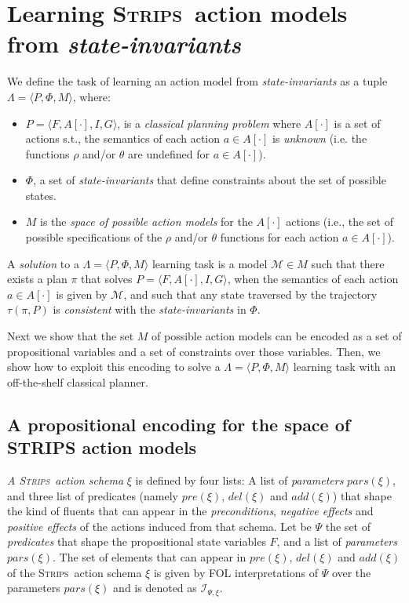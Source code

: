 \documentclass{article}
\newcommand{\tup}[1]{{\langle #1 \rangle}}
\newcommand{\strips}{\textsc{Strips}}
\begin{document}
\section{Learning \strips\ action models from {\em state-invariants}}
\label{sec:learning}
We define the task of learning an action model from {\em state-invariants} as a tuple $\Lambda=\tup{P,\Phi,M}$, where:
\begin{itemize}
\item $P=\tup{F,A[\cdot],I,G}$, is a {\em classical planning problem} where $A[\cdot]$ is a set of actions s.t., the semantics of each action $a\in A[\cdot]$ is {\em unknown} (i.e. the functions $\rho$ and/or $\theta$ are undefined for $a\in A[\cdot]$).
\item $\Phi$, a set of {\em state-invariants} that define constraints about the set of possible states.
\item $M$ is the {\em space of possible action models} for the $A[\cdot]$ actions (i.e., the set of possible specifications of the $\rho$ and/or $\theta$ functions for each action $a\in A[\cdot]$).
\end{itemize}

A {\em solution} to a $\Lambda=\tup{P,\Phi,M}$ learning task is a model $\mathcal{M}\in M$ such that there exists a plan $\pi$ that solves $P=\tup{F,A[\cdot],I,G}$, when the semantics of each action $a\in A[\cdot]$ is given by $\mathcal{M}$, and such that any state traversed by the trajectory $\tau(\pi,P)$ is {\em consistent} with the {\em state-invariants} in $\Phi$.

Next we show that the set $M$ of possible action models can be encoded as a set of propositional variables and a set of constraints over those variables. Then, we show how to exploit this encoding to solve a $\Lambda=\tup{P,\Phi,M}$ learning task with an off-the-shelf classical planner.


\subsection{A propositional encoding for the space of STRIPS action models}
{\em A \strips\ action schema} $\xi$ is defined by four lists: A list of {\em parameters} $pars(\xi)$, and three list of predicates (namely $pre(\xi)$, $del(\xi)$ and $add(\xi)$) that shape the kind of fluents that can appear in the {\em preconditions}, {\em negative effects} and {\em positive effects} of the actions induced from that schema. Let be $\Psi$ the set of {\em predicates} that shape the propositional state variables $F$, and a list of {\em parameters} $pars(\xi)$. The set of elements that can appear in $pre(\xi)$, $del(\xi)$ and $add(\xi)$ of the \strips\ action schema $\xi$ is given by FOL interpretations of $\Psi$ over the parameters $pars(\xi)$ and is denoted as ${\mathcal I}_{\Psi,\xi}$.
\end{document}
